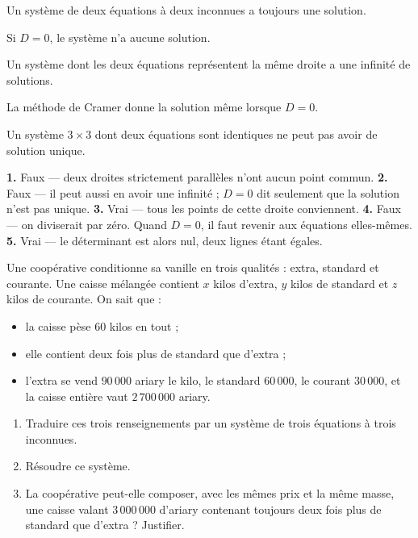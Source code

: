 \begin{vraifaux}
\exo Un système de deux équations à deux inconnues a toujours une solution.

\exo Si $D = 0$, le système n'a aucune solution.

\exo Un système dont les deux équations représentent la même droite a une
infinité de solutions.

\exo La méthode de Cramer donne la solution même lorsque $D = 0$.

\exo Un système $3\times3$ dont deux équations sont identiques ne peut pas
avoir de solution unique.
\end{vraifaux}

\begin{corrige}
\textbf{1.} Faux — deux droites strictement parallèles n'ont aucun point
commun.
\textbf{2.} Faux — il peut aussi en avoir une infinité ; $D = 0$ dit
seulement que la solution n'est pas unique.
\textbf{3.} Vrai — tous les points de cette droite conviennent.
\textbf{4.} Faux — on diviserait par zéro. Quand $D = 0$, il faut revenir aux
équations elles-mêmes.
\textbf{5.} Vrai — le déterminant est alors nul, deux lignes étant égales.
\end{corrige}

\begin{situation}
Une coopérative conditionne sa vanille en trois qualités :
extra, standard et courante. Une caisse mélangée contient $x$ kilos d'extra,
$y$ kilos de standard et $z$ kilos de courante. On sait que :

\begin{itemize}[leftmargin=1.3em, itemsep=0.15em]
  \item la caisse pèse $60$ kilos en tout ;
  \item elle contient deux fois plus de standard que d'extra ;
  \item l'extra se vend $90\,000$ ariary le kilo, le standard $60\,000$, le
        courant $30\,000$, et la caisse entière vaut $2\,700\,000$ ariary.
\end{itemize}

\begin{enumerate}[label=\textbf{\arabic*.}, leftmargin=*, itemsep=0.3em]
  \item Traduire ces trois renseignements par un système de trois équations à
        trois inconnues.
  \item Résoudre ce système.
  \item La coopérative peut-elle composer, avec les mêmes prix et la même
        masse, une caisse valant $3\,000\,000$ d'ariary contenant toujours
        deux fois plus de standard que d'extra ? Justifier.
\end{enumerate}
\end{situation}


